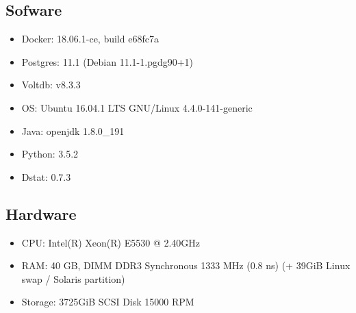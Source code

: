 \documentclass[main.tex]{subfiles}
\begin{document}
    \subsection{Sofware}
    \begin{itemize}
        \item 
        Docker: 18.06.1-ce, build e68fc7a
        \item
        Postgres: 11.1 (Debian 11.1-1.pgdg90+1)
        \item
        Voltdb: v8.3.3 
        \item
        OS: Ubuntu 16.04.1 LTS GNU/Linux 4.4.0-141-generic
        \item
        Java: openjdk 1.8.0\_191
        \item
        Python: 3.5.2
        \item
        Dstat: 0.7.3
    \end{itemize}
    \subsection{Hardware}
    \begin{itemize}
        \item 
        CPU: Intel(R) Xeon(R) E5530 @ 2.40GHz
        \item 
        RAM: 40 GB, DIMM DDR3 Synchronous 1333 MHz (0.8 ns) (+ 39GiB Linux swap / Solaris partition)
        \item 
        Storage: 3725GiB SCSI Disk 15000 RPM
    \end{itemize}
\end{document}
